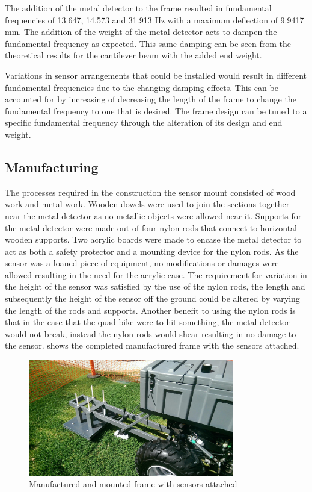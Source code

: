 \documentclass[main.tex]{subfiles}
\begin{document}
The addition of the metal detector to the frame resulted in fundamental frequencies of 13.647, 14.573 and 31.913 Hz with a maximum deflection of 9.9417 mm. The addition of the weight of the metal detector acts to dampen the fundamental frequency as expected. This same damping can be seen from the theoretical results for the cantilever beam with the added end weight.

Variations in sensor arrangements that could be installed would result in different fundamental frequencies due to the changing damping effects. This can be accounted for by increasing of decreasing the length of the frame to change the fundamental frequency to one that is desired. The frame design can be tuned to a specific fundamental frequency through the alteration of its design and end weight.   

\subsection{Manufacturing}
The processes required in the construction the sensor mount consisted of wood work and metal work. Wooden dowels were used to join the sections together near the metal detector as no metallic objects were allowed near it. Supports for the metal detector were made out of four nylon rods that connect to horizontal wooden supports. Two acrylic boards were made to encase the metal detector to act as both a safety protector and a mounting device for the nylon rods. As the sensor was a loaned piece of equipment, no modifications or damages were allowed  resulting in the need for the acrylic case. The requirement for variation in the height of the sensor was satisfied by the use of the nylon rods, the length and subsequently the height of the sensor off the ground could be altered by varying the length of the rods and supports. Another benefit to using the nylon rods is that in the case that the quad bike were to hit something, the metal detector would not break, instead the nylon rods would shear resulting in no damage to the sensor.
 shows the completed manufactured frame with the sensors attached. 
\begin{figure}[ht]
\includegraphics[width=0.8\textwidth]{4-DetailedDesign/QuadBikeFinalFrame.jpg}
\centering
\caption{Manufactured and mounted frame with sensors attached} 
\end{figure}
\end{document}
